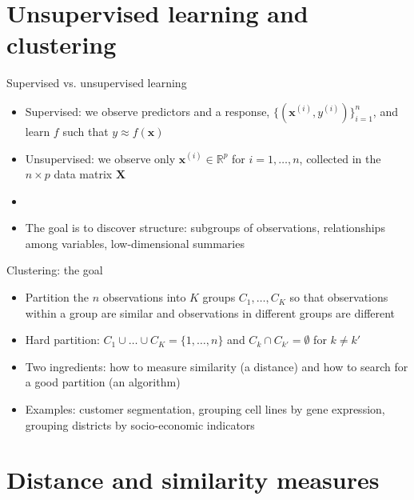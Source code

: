 \section{Unsupervised learning and clustering}

\begin{frame}{Supervised vs. unsupervised learning}
    \begin{itemize}
        \item Supervised: we observe predictors and a response, $\{(\mathbf{x}^{(i)}, y^{(i)})\}_{i=1}^{n}$, and learn $f$ such that $y \approx f(\mathbf{x})$
        \item Unsupervised: we observe only $\mathbf{x}^{(i)} \in \mathbb{R}^p$ for $i = 1, \dots, n$, collected in the $n \times p$ data matrix $\mathbf{X}$
        \item {}
        \item The goal is to discover structure: subgroups of observations, relationships among variables, low-dimensional summaries
    \end{itemize}
\end{frame}

\begin{frame}{Clustering: the goal}
    \begin{itemize}
        \item Partition the $n$ observations into $K$ groups $C_1, \dots, C_K$ so that observations within a group are similar and observations in different groups are different
        \item Hard partition: $C_1 \cup \dots \cup C_K = \{1, \dots, n\}$ and $C_k \cap C_{k'} = \emptyset$ for $k \neq k'$
        \item Two ingredients: how to measure similarity (a distance) and how to search for a good partition (an algorithm)
        \item Examples: customer segmentation, grouping cell lines by gene expression, grouping districts by socio-economic indicators
    \end{itemize}
\end{frame}


\section{Distance and similarity measures}

